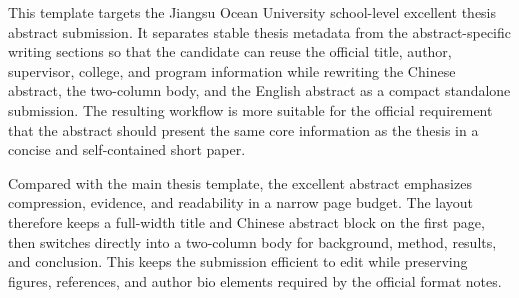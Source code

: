 This template targets the Jiangsu Ocean University school-level excellent thesis abstract submission. It separates stable thesis metadata from the abstract-specific writing sections so that the candidate can reuse the official title, author, supervisor, college, and program information while rewriting the Chinese abstract, the two-column body, and the English abstract as a compact standalone submission. The resulting workflow is more suitable for the official requirement that the abstract should present the same core information as the thesis in a concise and self-contained short paper.

Compared with the main thesis template, the excellent abstract emphasizes compression, evidence, and readability in a narrow page budget. The layout therefore keeps a full-width title and Chinese abstract block on the first page, then switches directly into a two-column body for background, method, results, and conclusion. This keeps the submission efficient to edit while preserving figures, references, and author bio elements required by the official format notes.
